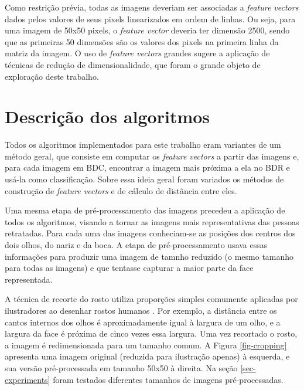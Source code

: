 \documentclass[10pt,twocolumn,letterpaper]{article}
\begin{document}
Como restrição prévia, todas as imagens deveriam ser associadas a \emph{feature vectors} dados pelos valores de seus pixels linearizados em ordem de linhas. Ou seja, para uma imagem de 50x50 pixels, o \emph{feature vector} deveria ter dimensão 2500, sendo que as primeiras 50 dimensões são os valores dos pixels na primeira linha da matriz da imagem. O uso de \emph{feature vectors} grandes sugere a aplicação de técnicas de redução de dimensionalidade, que foram o grande objeto de exploração deste trabalho.

\section{Descrição dos algoritmos}
\label{sec-algorithm}

Todos os algoritmos implementados para este trabalho eram variantes de um método geral, que consiste em computar os \emph{feature vectors} a partir das imagens e, para cada imagem em BDC, encontrar a imagem mais próxima a ela no BDR e usá-la como classificação. Sobre essa ideia geral foram variados os métodos de construção de \emph{feature vectors} e de cálculo de distância entre eles.

Uma mesma etapa de pré-processamento das imagens precedeu a aplicação de todos os algoritmos, visando a tornar as imagens mais representativas das pessoas retratadas. Para cada uma das imagens conheciam-se as posições dos centros dos dois olhos, do nariz e da boca. A etapa de pré-processamento usava essas informações para produzir uma imagem de tamnho reduzido (o mesmo tamanho para todas as imagens) e que tentasse capturar a maior parte da face representada.

A técnica de recorte do rosto utiliza proporções simples comumente aplicadas por ilustradores ao desenhar rostos humanos \cite{FacialProportions:2010:Online}. Por exemplo, a distância entre os cantos internos dos olhos é aproximadamente igual à largura de um olho, e a largura da face é próxima de cinco vezes essa largura. Uma vez recortado o rosto, a imagem é redimensionada para um tamanho comum. A Figura \ref{fig-cropping} apresenta uma imagem original (reduzida para ilustração apenas) à esquerda, e sua versão pré-processada em tamanho 50x50 à direita. Na seção \ref{sec-experiments} foram testados diferentes tamanhos de imagens pré-processadas.
\end{document}
